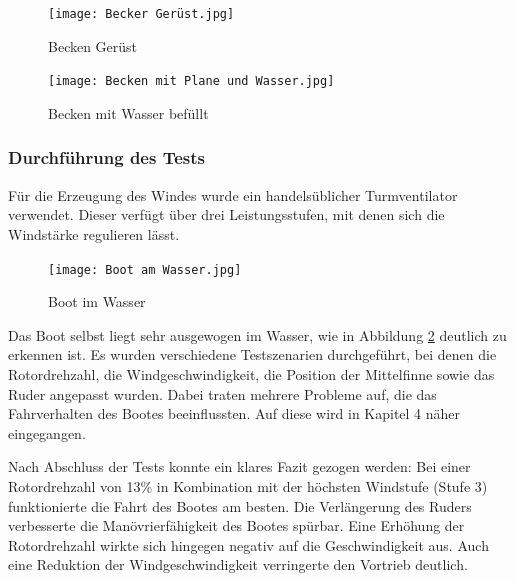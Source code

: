 \documentclass[a4paper,12pt]{article}
\begin{document}
\begin{figure}[H]
    \centering
    \begin{minipage}[b]{0.48\linewidth}
        \centering
        \texttt{[image: Becker Gerüst.jpg]}
        \caption{Becken Gerüst}
        \label{fig:Becken Gerüst}
    \end{minipage}
    \hfill
    \begin{minipage}[b]{0.49\linewidth}
        \centering
        \texttt{[image: Becken mit Plane und Wasser.jpg]}
        \caption{Becken mit Wasser befüllt}
        \label{fig:Becken mit Wasser befüllt}
    \end{minipage}
\end{figure}

\subsubsection{Durchführung des Tests}

Für die Erzeugung des Windes wurde ein handelsüblicher Turmventilator verwendet. Dieser verfügt über drei Leistungsstufen, mit denen sich die Windstärke regulieren lässt.

\begin{figure}[H]
    \centering
    \texttt{[image: Boot am Wasser.jpg]}
    \caption{Boot im Wasser}
    \label{fig:Boot im Wasser}
\end{figure}

Das Boot selbst liegt sehr ausgewogen im Wasser, wie in Abbildung \ref{fig:Boot im Wasser} deutlich zu erkennen ist.
Es wurden verschiedene Testszenarien durchgeführt, bei denen die Rotordrehzahl, die Windgeschwindigkeit, die Position der Mittelfinne sowie das Ruder angepasst wurden. Dabei traten mehrere Probleme auf, die das Fahrverhalten des Bootes beeinflussten. Auf diese wird in Kapitel 4 näher eingegangen.

Nach Abschluss der Tests konnte ein klares Fazit gezogen werden: Bei einer Rotordrehzahl von 13\% in Kombination mit der höchsten Windstufe (Stufe 3) funktionierte die Fahrt des Bootes am besten. Die Verlängerung des Ruders verbesserte die Manövrierfähigkeit des Bootes spürbar. Eine Erhöhung der Rotordrehzahl wirkte sich hingegen negativ auf die Geschwindigkeit aus. Auch eine Reduktion der Windgeschwindigkeit verringerte den Vortrieb deutlich.


\newpage


\newpage
\end{document}
